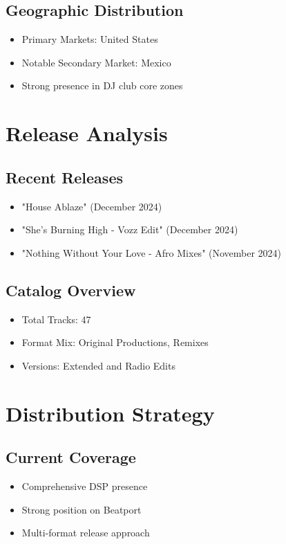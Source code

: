\documentclass{article}
\begin{document}
\subsection*{Geographic Distribution}
\begin{itemize}
\item Primary Markets: United States
\item Notable Secondary Market: Mexico
\item Strong presence in DJ club core zones
\end{itemize}

\section*{Release Analysis}

\subsection*{Recent Releases}
\begin{itemize}
\item "House Ablaze" (December 2024)
\item "She's Burning High - Vozz Edit" (December 2024)
\item "Nothing Without Your Love - Afro Mixes" (November 2024)
\end{itemize}

\subsection*{Catalog Overview}
\begin{itemize}
\item Total Tracks: 47
\item Format Mix: Original Productions, Remixes
\item Versions: Extended and Radio Edits
\end{itemize}

\section*{Distribution Strategy}

\subsection*{Current Coverage}
\begin{itemize}
\item Comprehensive DSP presence
\item Strong position on Beatport
\item Multi-format release approach
\end{itemize}
\end{document}
